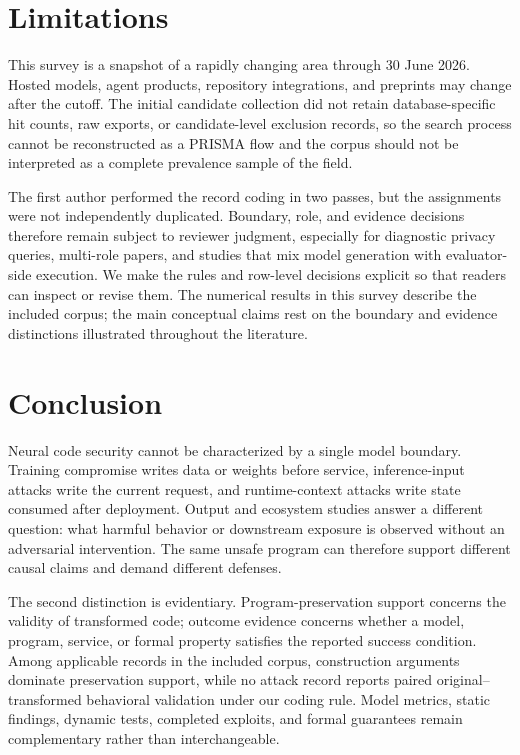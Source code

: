\documentclass[acmsmall,screen,review]{acmart}
\begin{document}

\section{Limitations} \label{sec:limitations}

This survey is a snapshot of a rapidly changing area through 30 June 2026. Hosted models, agent products, repository integrations, and preprints may change after the cutoff. The initial candidate collection did not retain database-specific hit counts, raw exports, or candidate-level exclusion records, so the search process cannot be reconstructed as a PRISMA flow and the corpus should not be interpreted as a complete prevalence sample of the field.

The first author performed the record coding in two passes, but the assignments were not independently duplicated. Boundary, role, and evidence decisions therefore remain subject to reviewer judgment, especially for diagnostic privacy queries, multi-role papers, and studies that mix model generation with evaluator-side execution. We make the rules and row-level decisions explicit so that readers can inspect or revise them. The numerical results in this survey describe the included corpus; the main conceptual claims rest on the boundary and evidence distinctions illustrated throughout the literature.

\section{Conclusion} \label{sec:conclusion}

Neural code security cannot be characterized by a single model boundary. Training compromise writes data or weights before service, inference-input attacks write the current request, and runtime-context attacks write state consumed after deployment. Output and ecosystem studies answer a different question: what harmful behavior or downstream exposure is observed without an adversarial intervention. The same unsafe program can therefore support different causal claims and demand different defenses.

The second distinction is evidentiary. Program-preservation support concerns the validity of transformed code; outcome evidence concerns whether a model, program, service, or formal property satisfies the reported success condition. Among applicable records in the included corpus, construction arguments dominate preservation support, while no attack record reports paired original--transformed behavioral validation under our coding rule. Model metrics, static findings, dynamic tests, completed exploits, and formal guarantees remain complementary rather than interchangeable.
\end{document}
